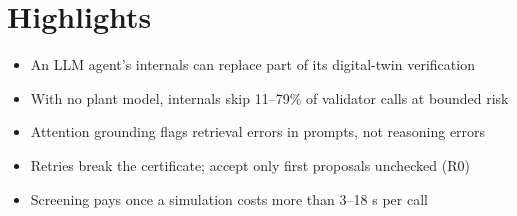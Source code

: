 \documentclass{article}
\begin{document}
\section*{Highlights}
\begin{itemize}
\item An LLM agent's internals can replace part of its digital-twin verification
\item With no plant model, internals skip 11--79\% of validator calls at bounded risk
\item Attention grounding flags retrieval errors in prompts, not reasoning errors
\item Retries break the certificate; accept only first proposals unchecked (R0)
\item Screening pays once a simulation costs more than 3--18 s per call
\end{itemize}
\end{document}
